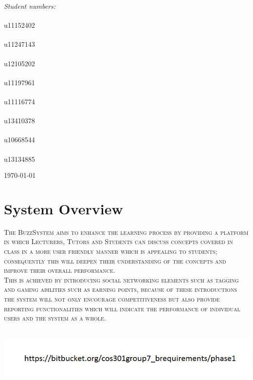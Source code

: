 \documentclass[a4paper,12pt]{report}
\begin{document}
\begin{titlepage}
\begin{center}
\begin{minipage}{0.4\textwidth}
\begin{flushright}
\emph{Student numbers:} \\
\emph{}\\
u11152402
\emph{}\\
\emph{}\\
u11247143
\emph{}\\
\emph{}\\
u12105202
\emph{}\\
\emph{}\\
u11197961
\emph{}\\
\emph{}\\
u11116774
\emph{}\\
\emph{}\\
u13410378
\emph{}\\
\emph{}\\
u10668544
\emph{}\\
\emph{}\\
u13134885


\end{flushright}
\end{minipage}
\vfill


{\large \today}
\end{center}
\end{titlepage}
\setcounter{chapter}{1}
\renewcommand{\thesection}{\arabic{section}}


\section{System Overview}
\textsc{The BuzzSystem aims to enhance the learning process by providing a platform in which Lecturers, Tutors and Students can discuss concepts covered in class in a more user friendly manner which is appealing to students; consequently this will deepen their understanding of the concepts and improve their overall performance. 
\emph{}\\
This is achieved by introducing social networking elements such as tagging and gaming abilities such as earning points, because of these introductions  the system will not only encourage competitiveness but also provide reporting functionalities which will indicate the performance of individual users and the system as a whole.}

\emph{}\\
\includegraphics[width=1\textwidth]{./Url.png}\\[0.4cm]
\end{document}
